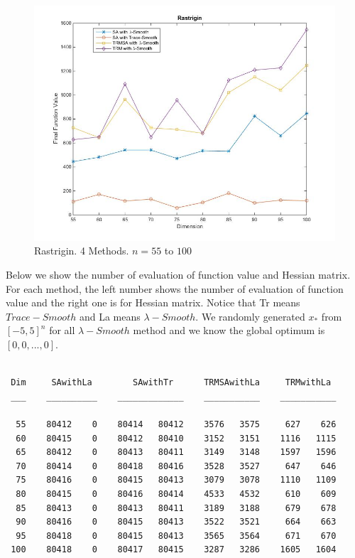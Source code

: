 \documentclass[letterpaper,12pt,titlepage,oneside,final]{book}
\begin{document}
\begin{figure}[H]
\includegraphics[scale=0.6]{rast4methods2.jpg}
\caption{Rastrigin. 4 Methods. $n=55$ to $100$}
\end{figure}

Below we show the number of evaluation of function value and Hessian matrix. For each method, the left number shows the number of evaluation of function value and the right one is for Hessian matrix. Notice that Tr means $Trace-Smooth$ and La means $\lambda-Smooth$. We randomly generated $x_*$ from $[-5,5]^n$ for all $\lambda-Smooth$ method and we know the global optimum is $[0,0,...,0]$.

\begin{lstlisting}

 Dim     SAwithLa        SAwithTr      TRMSAwithLa     TRMwithLa  
 ___    __________    _____________    ___________    ___________

  55    80412    0    80414   80412    3576   3575     627    626
  60    80415    0    80412   80410    3152   3151    1116   1115
  65    80412    0    80413   80411    3149   3148    1597   1596
  70    80414    0    80418   80416    3528   3527     647    646
  75    80416    0    80415   80413    3079   3078    1110   1109
  80    80415    0    80416   80414    4533   4532     610    609
  85    80413    0    80413   80411    3189   3188     679    678
  90    80416    0    80415   80413    3522   3521     664    663
  95    80418    0    80415   80413    3565   3564     671    670
 100    80418    0    80417   80415    3287   3286    1605   1604
 
\end{lstlisting}
\end{document}
